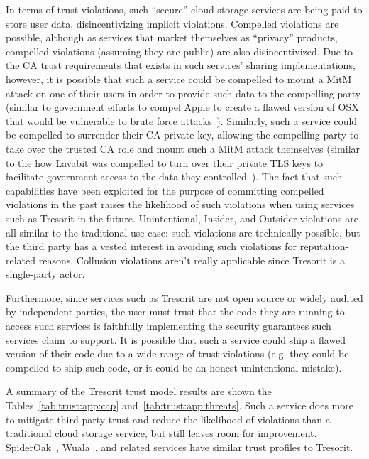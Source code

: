 In terms of trust violations, such ``secure'' cloud storage services
are being paid to store user data, disincentivizing implicit
violations. Compelled violations are possible, although as services
that market themselves as ``privacy'' products, compelled violations
(assuming they are public) are also disincentivized. Due to the CA
trust requirements that exists in such services' sharing
implementations, however, it is possible that such a service could be
compelled to mount a MitM attack on one of their users in order to
provide such data to the compelling party (similar to government
efforts to compel Apple to create a flawed version of OSX that would
be vulnerable to brute force attacks~\cite{ars-cookvfbi}). Similarly,
such a service could be compelled to surrender their CA private key,
allowing the compelling party to take over the trusted CA role and
mount such a MitM attack themselves (similar to the how Lavabit was
compelled to turn over their private TLS keys to facilitate government
access to the data they controlled~\cite{levsion-lavabit}). The fact
that such capabilities have been exploited for the purpose of
committing compelled violations in the past raises the likelihood of
such violations when using services such as Tresorit in the
future. Unintentional, Insider, and Outsider violations are all
similar to the traditional use case: such violations are technically
possible, but the third party has a vested interest in avoiding such
violations for reputation-related reasons. Collusion violations aren't
really applicable since Tresorit is a single-party actor.

Furthermore, since services such as Tresorit are not open source or
widely audited by independent parties, the user must trust that the
code they are running to access such services is faithfully
implementing the security guarantees such services claim to
support. It is possible that such a service could ship a flawed
version of their code due to a wide range of trust violations
(e.g. they could be compelled to ship such code, or it could be an
honest unintentional mistake).

A summary of the Tresorit trust model results are shown the
Tables~\ref{tab:trust:app:cap} and~\ref{tab:trust:app:threats}. Such a
service does more to mitigate third party trust and reduce the
likelihood of violations than a traditional cloud storage service, but
still leaves room for improvement. SpiderOak~\cite{spideroak},
Wuala~\cite{wuala}, and related services have similar trust profiles
to Tresorit.

